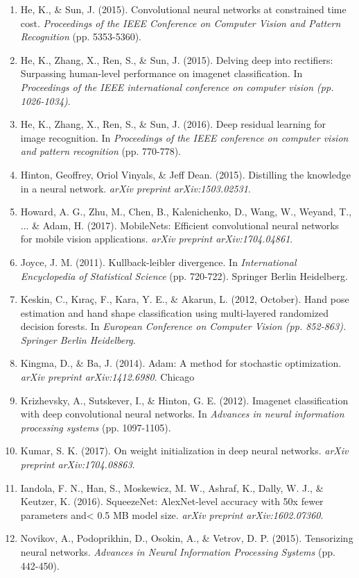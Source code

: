 \documentclass{article}
\begin{document}
{\begin{enumerate}
\item He, K., \& Sun, J. (2015). Convolutional neural networks at constrained time cost. \emph{Proceedings of the IEEE Conference on Computer Vision and Pattern Recognition} (pp. 5353-5360).
\item He, K., Zhang, X., Ren, S., \& Sun, J. (2015). Delving deep into rectifiers: Surpassing human-level performance on imagenet classification. In \emph{Proceedings of the IEEE international conference on computer vision (pp. 1026-1034)}.
\item He, K., Zhang, X., Ren, S., \& Sun, J. (2016). Deep residual learning for image recognition. In \emph{Proceedings of the IEEE conference on computer vision and pattern recognition} (pp. 770-778).
\item Hinton, Geoffrey, Oriol Vinyals, \& Jeff Dean.  (2015). Distilling the knowledge in a neural network. \emph{arXiv preprint arXiv:1503.02531}.
\item Howard, A. G., Zhu, M., Chen, B., Kalenichenko, D., Wang, W., Weyand, T., ... \& Adam, H. (2017). MobileNets: Efficient convolutional neural networks for mobile vision applications. \emph{arXiv preprint arXiv:1704.04861}.
\item Joyce, J. M. (2011). Kullback-leibler divergence. In \emph{International Encyclopedia of Statistical Science} (pp. 720-722). Springer Berlin Heidelberg.
\item Keskin, C., Kıraç, F., Kara, Y. E., \& Akarun, L. (2012, October). Hand pose estimation and hand shape classification using multi-layered randomized decision forests. In \emph{European Conference on Computer Vision (pp. 852-863). Springer Berlin Heidelberg}.
\item Kingma, D., \& Ba, J. (2014). Adam: A method for stochastic optimization. \emph{arXiv preprint arXiv:1412.6980}.
Chicago	
\item Krizhevsky, A., Sutskever, I., \& Hinton, G. E. (2012). Imagenet classification with deep convolutional neural networks. In \emph{Advances in neural information processing systems} (pp. 1097-1105).
\item Kumar, S. K. (2017). On weight initialization in deep neural networks. \emph{arXiv preprint arXiv:1704.08863}.
\item Iandola, F. N., Han, S., Moskewicz, M. W., Ashraf, K., Dally, W. J., \& Keutzer, K. (2016). SqueezeNet: AlexNet-level accuracy with 50x fewer parameters and< 0.5 MB model size. \emph{arXiv preprint arXiv:1602.07360}.
\item Novikov, A., Podoprikhin, D., Osokin, A., \& Vetrov, D. P. (2015). Tensorizing neural networks. \emph{Advances in Neural Information Processing Systems} (pp. 442-450).

\end{enumerate}}
\end{document}
